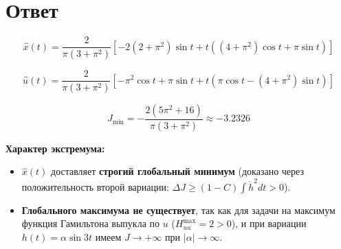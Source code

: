 \documentclass[12pt,a4paper]{article}
\begin{document}
\section*{Ответ}

\noindent
\[
\boxed{
\hat{x}(t) = \frac{2}{\pi(3+\pi^2)} \left[ -2(2+\pi^2)\sin t + t\left((4+\pi^2)\cos t + \pi\sin t\right) \right]
}
\]

\noindent
\[
\boxed{
\hat{u}(t) = \frac{2}{\pi(3+\pi^2)} \left[ -\pi^2\cos t + \pi\sin t + t\left(\pi\cos t - (4+\pi^2)\sin t\right) \right]
}
\]

\noindent
\[
\boxed{
J_{\min} = -\frac{2(5\pi^2+16)}{\pi(3+\pi^2)} \approx -3.2326
}
\]

\noindent
\textbf{Характер экстремума:}
\begin{itemize}
    \item \(\hat{x}(t)\) доставляет \textbf{строгий глобальный минимум} (доказано через положительность второй вариации: \(\Delta J \ge (1-C)\int \dot{h}^2 dt > 0\)).
    \item \textbf{Глобального максимума не существует}, так как для задачи на максимум функция Гамильтона выпукла по \(u\) (\(H^{\max}_{uu} = 2 > 0\)), и при вариации \(h(t) = \alpha \sin 3t\) имеем \(J \to +\infty\) при \(|\alpha| \to \infty\).
\end{itemize}
\end{document}
